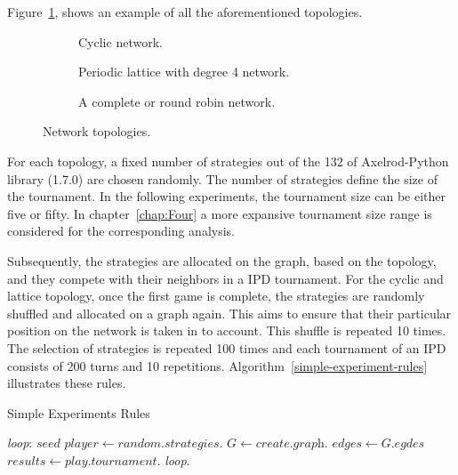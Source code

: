 Figure~\ref{fig:networks}, shows an example of all the aforementioned topologies.

\begin{figure}[!hbtp]  %
	\centering
	\begin{subfigure}[h]{0.45\textwidth}
		\centering
		
		\caption{Cyclic network.}
	\end{subfigure}
	\hfill
	\begin{subfigure}[h]{0.52\textwidth}\centering
		\centering
		
		\caption{Periodic lattice with degree 4 network.}
	\end{subfigure}
	\hfill
	\begin{subfigure}[h]{0.52\textwidth}\centering
		\centering
		
		\caption{A complete or round robin network.}
	\end{subfigure}
	\caption{Network topologies.}
	\label{fig:networks}
\end{figure}


For each topology, a fixed number of strategies out of the 132 of Axelrod-Python
library (1.7.0) are chosen randomly. The number of strategies define the size of the
tournament. In the following experiments, the tournament size can be either
five or fifty. In chapter~\ref{chap:Four} a more expansive tournament size range is
considered for the corresponding analysis.

Subsequently, the strategies are allocated on the graph, based
on the topology, and they compete with their neighbors in a IPD tournament.
For the cyclic and lattice topology, once the first game is complete,
the strategies are randomly shuffled and allocated on a graph again. This aims
to ensure that their particular position on the network is taken in to account.
This shuffle is repeated 10 times. The selection of strategies is repeated 100 times
and each tournament of an IPD consists of 200 turns and 10 repetitions.
Algorithm~\ref{simple-experiment-rules} illustrates these rules.

\begin{algorithm}
	\caption{Simple Experiments Rules}\label{simple-experiment-rules}
	\begin{algorithmic}
		\BState \emph{loop}:
		\State $seed$ 
		\State $player \gets \textit{random.strategies}$.
		\State $G \gets \textit{create.graph}$.
		\State $edges \gets \textit{G.egdes}$
		\State $results \gets \textit{play.tournament}$.
		\emph{loop}.
		\EndFor
		\EndFor
		\EndProcedure
	\end{algorithmic}
\end{algorithm}

